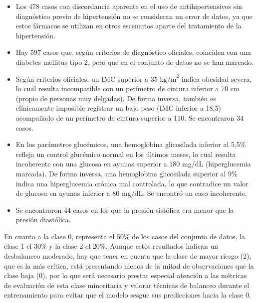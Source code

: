 \documentclass[journal,onecolumn]{IEEEtran}
\begin{document}
\begin{itemize}
    \item Los 478 casos con discordancia aparente en el uso de antihipertensivos sin diagnóstico previo de hipertensión no se consideran un error de datos, ya que estos fármacos se utilizan en otros escenarios aparte del tratamiento de la hipertensión.

    \item Hay 597 casos que, según criterios de diagnóstico oficiales, coinciden con una diabetes mellitus tipo 2, pero que en el conjunto de datos no se han marcado.

    \item Según criterios oficiales, un IMC superior a 35 $\text{kg/m}^2$ indica obesidad severa, lo cual resulta incompatible con un perímetro de cintura inferior a 70 cm (propio de personas muy delgadas). De forma inversa, también es clínicamente imposible registrar un bajo peso (IMC inferior a 18,5) acompañado de un perímetro de cintura superior a 110. Se encontraron 34 casos.

   \item En los parámetros glucémicos, una hemoglobina glicosilada inferior al 5,5\% refleja un control glucémico normal en los últimos meses, lo cual resulta incoherente con una glucosa en ayunas superior a 180 mg/dL (hiperglucemia marcada). De forma inversa, una hemoglobina glicosilada superior al 9\% indica una hiperglucemia crónica mal controlada, lo que contradice un valor de glucosa en ayunas inferior a 80 mg/dL. Se encontró un caso incoherente.

   \item Se encontraron 44 casos en los que la presión sistólica era menor que la presión diastólica.

\end{itemize}

En cuanto a la clase 0, representa el 50\% de los casos del conjunto de datos, la clase 1 el 30\% y la clase 2 el 20\%. Aunque estos resultados indican un desbalanceo moderado, hay que tener en cuenta que la clase de mayor riesgo (2), que es la más crítica, está presentando menos de la mitad de observaciones que la clase baja (0), por lo que será necesario prestar especial atención a las métricas de evaluación de esta clase minoritaria y valorar técnicas de balanceo durante el entrenamiento para evitar que el modelo sesgue sus predicciones hacia la clase 0.


\end{document}

